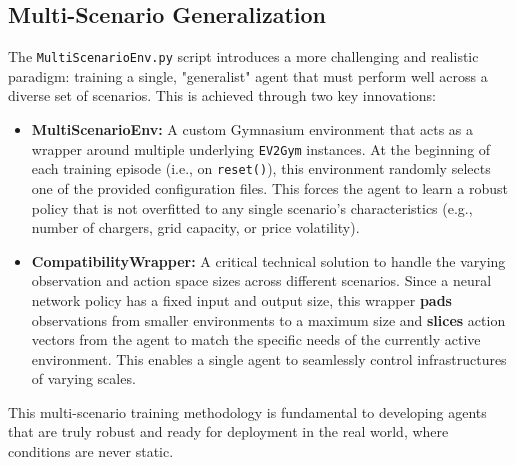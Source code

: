 \subsection{Multi-Scenario Generalization}
The \texttt{MultiScenarioEnv.py} script introduces a more challenging and realistic paradigm: training a single, "generalist" agent that must perform well across a diverse set of scenarios. This is achieved through two key innovations:
\begin{itemize}
    \item \textbf{MultiScenarioEnv:} A custom Gymnasium environment that acts as a wrapper around multiple underlying \texttt{EV2Gym} instances. At the beginning of each training episode (i.e., on \texttt{reset()}), this environment randomly selects one of the provided configuration files. This forces the agent to learn a robust policy that is not overfitted to any single scenario's characteristics (e.g., number of chargers, grid capacity, or price volatility).
    \item \textbf{CompatibilityWrapper:} A critical technical solution to handle the varying observation and action space sizes across different scenarios. Since a neural network policy has a fixed input and output size, this wrapper \textbf{pads} observations from smaller environments to a maximum size and \textbf{slices} action vectors from the agent to match the specific needs of the currently active environment. This enables a single agent to seamlessly control infrastructures of varying scales.
\end{itemize}
This multi-scenario training methodology is fundamental to developing agents that are truly robust and ready for deployment in the real world, where conditions are never static.

